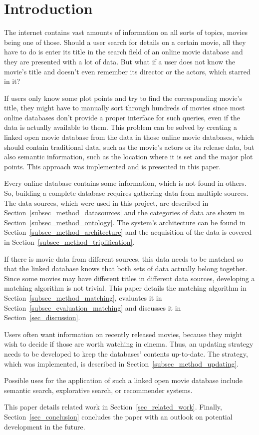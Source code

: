 \section{Introduction}
\label{sec_introduction}

The internet contains vast amounts of information on all sorts of topics, movies being one of those.
Should a user search for details on a certain movie, all they have to do is enter its title in the search field of an online movie database and they are presented with a lot of data.
But what if a user does not know the movie's title and doesn't even remember its director or the actors, which starred in it?

If users only know some plot points and try to find the corresponding movie's title, they might have to manually sort through hundreds of movies since most online databases don't provide a proper interface for such queries, even if the data is actually available to them.
This problem can be solved by creating a linked open movie database from the data in those online movie databases, which should contain traditional data, such as the movie's actors or its release data, but also semantic information, such as the location where it is set and the major plot points.
This approach was implemented and is presented in this paper.

Every online database contains some information, which is not found in others.
So, building a complete database requires gathering data from multiple sources.
The data sources, which were used in this project, are described in Section~\ref{subsec_method_datasources} and the categories of data are shown in Section~\ref{subsec_method_ontology}.
The system's architecture can be found in Section~\ref{subsec_method_architecture} and the acquisition of the data is covered in Section~\ref{subsec_method_triplification}.

If there is movie data from different sources, this data needs to be matched so that the linked database knows that both sets of data actually belong together.
Since some movies may have different titles in different data sources, developing a matching algorithm is not trivial.
This paper details the matching algorithm in Section~\ref{subsec_method_matching}, evaluates it in Section~\ref{subsec_evaluation_matching} and discusses it in Section~\ref{sec_discussion}.

Users often want information on recently released movies, because they might wish to decide if those are worth watching in cinema.
Thus, an updating strategy needs to be developed to keep the databases' contents up-to-date.
The strategy, which was implemented, is described in Section~\ref{subsec_method_updating}.

Possible uses for the application of such a linked open movie database include semantic search, explorative search, or recommender systems.

This paper details related work in Section~\ref{sec_related_work}.
Finally, Section~\ref{sec_conclusion} concludes the paper with an outlook on potential development in the future.

